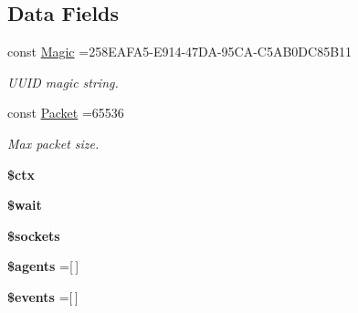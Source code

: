 \subsection*{Data Fields}
\begin{DoxyCompactItemize}
\item 
\hypertarget{class_c_l_i_1_1_w_s_a0f8417d2e128a6f19f2b5e0a0a883de0}{}\label{class_c_l_i_1_1_w_s_a0f8417d2e128a6f19f2b5e0a0a883de0} 
const \hyperlink{class_c_l_i_1_1_w_s_a0f8417d2e128a6f19f2b5e0a0a883de0}{Magic} =\textquotesingle{}258\+E\+A\+F\+A5-\/\+E914-\/47\+D\+A-\/95\+C\+A-\/\+C5\+A\+B0\+D\+C85\+B11\textquotesingle{}
\begin{DoxyCompactList}\small\item\em U\+U\+ID magic string. \end{DoxyCompactList}\item 
\hypertarget{class_c_l_i_1_1_w_s_adbc81c45b48c6cdfffe9fc4752007493}{}\label{class_c_l_i_1_1_w_s_adbc81c45b48c6cdfffe9fc4752007493} 
const \hyperlink{class_c_l_i_1_1_w_s_adbc81c45b48c6cdfffe9fc4752007493}{Packet} =65536
\begin{DoxyCompactList}\small\item\em Max packet size. \end{DoxyCompactList}\item 
\hypertarget{class_c_l_i_1_1_w_s_aa0f7bf6b5a60518284ef88fa33e264f2}{}\label{class_c_l_i_1_1_w_s_aa0f7bf6b5a60518284ef88fa33e264f2} 
{\bfseries \$ctx}
\item 
\hypertarget{class_c_l_i_1_1_w_s_a165566db3c2de8a5e20d0957ed606e46}{}\label{class_c_l_i_1_1_w_s_a165566db3c2de8a5e20d0957ed606e46} 
{\bfseries \$wait}
\item 
\hypertarget{class_c_l_i_1_1_w_s_a4faf536a5ff25a28adb9891716556dc6}{}\label{class_c_l_i_1_1_w_s_a4faf536a5ff25a28adb9891716556dc6} 
{\bfseries \$sockets}
\item 
\hypertarget{class_c_l_i_1_1_w_s_af8624bfcd6ccf58a6906baf72ec078df}{}\label{class_c_l_i_1_1_w_s_af8624bfcd6ccf58a6906baf72ec078df} 
{\bfseries \$agents} =\mbox{[}$\,$\mbox{]}
\item 
\hypertarget{class_c_l_i_1_1_w_s_a1bcec9bbd34255927faaf155bf3a940a}{}\label{class_c_l_i_1_1_w_s_a1bcec9bbd34255927faaf155bf3a940a} 
{\bfseries \$events} =\mbox{[}$\,$\mbox{]}
\end{DoxyCompactItemize}
{\bf }\par
